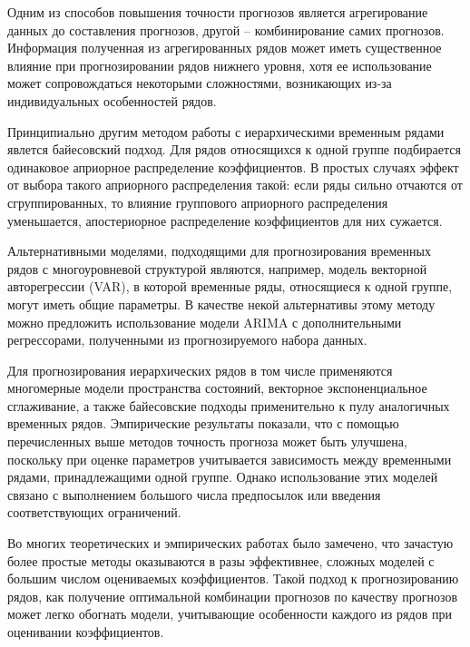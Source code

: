 \documentclass[12pt,a4paper, oneside]{extreport}
\begin{document}
Одним из способов повышения точности прогнозов является агрегирование данных до составления прогнозов, другой -- комбинирование  самих прогнозов. 
Информация полученная из агрегированных рядов может иметь существенное влияние при прогнозировании рядов нижнего уровня, хотя ее использование может сопровождаться некоторыми сложностями, возникающих из-за индивидуальных особенностей рядов. 



Принципиально другим методом работы с иерархическими временным рядами явлется байесовский подход. Для рядов относящихся к одной группе подбирается одинаковое априорное распределение коэффициентов.
В простых случаях  эффект от выбора такого априорного распределения  такой: если ряды сильно отчаются от сгруппированных, то влияние группового априорного распределения уменьшается,  апостериорное распределение коэффициентов для них сужается.



Альтернативными моделями, подходящими для прогнозирования  временных рядов с многоуровневой  структурой являются, например, модель  векторной авторегрессии (VAR), в которой  временные ряды, относящиеся к одной группе, могут  иметь общие параметры. В качестве некой альтернативы этому методу можно предложить использование модели ARIMA с дополнительными регрессорами, полученными из прогнозируемого набора данных. 

Для прогнозирования иерархических рядов в том числе применяются многомерные модели пространства состояний, векторное  экспоненциальное сглаживание, а также  байесовские подходы применительно  к пулу аналогичных временных рядов\cite{duncan2001forecasting}.
Эмпирические результаты показали, что с помощью перечисленных выше методов точность прогноза может быть улучшена, поскольку при оценке параметров учитывается    зависимость  между временными рядами, принадлежащими одной группе. Однако использование этих моделей связано с выполнением большого числа предпосылок или введения соответствующих ограничений.


Во многих теоретических и эмпирических работах было замечено, что зачастую более простые методы  оказываются в разы эффективнее, сложных моделей с большим числом оцениваемых  коэффициентов. 
Такой    подход к прогнозированию рядов, как получение оптимальной комбинации прогнозов  по качеству прогнозов может легко обогнать модели, учитывающие особенности каждого из рядов при оценивании коэффициентов. 
\end{document}

